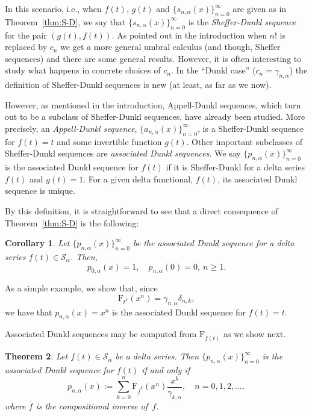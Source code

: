 \documentclass[11pt]{article}
\theoremstyle{plain}
\newtheorem{theorem}{Theorem}[section]
\newtheorem{corollary}[theorem]{Corollary}
\theoremstyle{remark}
\numberwithin{equation}{section} %
\newcommand{\Sa}{\mathcal{S}_{\alpha}}
\newcommand{\FF}{\mathrm{F}}
\begin{document}
In this scenario, i.e., when $f(t)$, $g(t)$ and $\{s_{n,\alpha}(x)\}_{n=0}^{\infty}$ are given as in Theorem~\ref{thm:S-D}, we say that $\{s_{n,\alpha}(x)\}_{n=0}^{\infty}$ is the \textit{Sheffer-Dunkl sequence} for the pair $(g(t),f(t))$. 
As pointed out in the introduction when $n!$ is replaced by $c_n$ we get a more general umbral calculus (and though, Sheffer sequences) and there are some general results. However, it is often interesting to study what happens in concrete choices of $c_n$. In the ``Dunkl case'' ($c_n = \gamma_{n,\alpha}$) the definition of Sheffer-Dunkl sequences is new (at least, as far as we now). 


However, as mentioned in the introduction, Appell-Dunkl sequences, which turn out to be a subclass of Sheffer-Dunkl sequences, have already been studied. More precisely, an \textit{Appell-Dunkl sequence}, $\{a_{n,\alpha}(x)\}_{n=0}^\infty$, is a Sheffer-Dunkl sequence for $f(t) = t$ and some invertible function $g(t)$.
Other important subclasses of Sheffer-Dunkl sequences are \textit{associated Dunkl sequences}. We say $\{p_{n,\alpha}(x)\}_{n=0}^{\infty}$ is the associated Dunkl sequence for $f(t)$ if it is Sheffer-Dunkl for a delta series $f(t)$ and $g(t) = 1$. For a given delta functional, $f(t)$, its associated Dunkl sequence is unique. 

By this definition, it is straightforward to see that a direct consequence of Theorem~\ref{thm:S-D} is the following:
\begin{corollary}
Let $\{p_{n,\alpha}(x)\}_{n=0}^{\infty}$ be the associated Dunkl sequence for a delta series $f(t) \in \Sa$. Then,
\begin{equation}
\label{eq:asociados}
p_{0,\alpha}(x) = 1,\quad p_{n,\alpha}(0) = 0,\ n\ge 1.
\end{equation}
\end{corollary}

As a simple example, we show that, since 
\[
\FF_{t^k}(x^n) = \gamma_{n,\alpha}\delta_{n,k},
\]
we have that $p_{n,\alpha}(x) = x^n$ is the associated Dunkl sequence for $f(t) = t$.

Associated Dunkl sequences may be computed from $\FF_{\overline{f}(t)}$ as we show next.

\begin{theorem}
Let $f(t) \in \Sa$ be a delta series. Then $\{p_{n,\alpha}(x)\}_{n=0}^{\infty}$ is the associated Dunkl sequence for $f(t)$ if and only if
\begin{equation}
\label{eq:pn-fk}
p_{n,\alpha}(x) := \sum_{k=0}^n {\FF_{\overline{f}^k}(x^n)} \frac{x^k}{\gamma_{k,\alpha}},
\quad n= 0,1,2,\dots,
\end{equation}
where $\overline{f}$ is the compositional inverse of~$f$.
\end{theorem}
\end{document}

